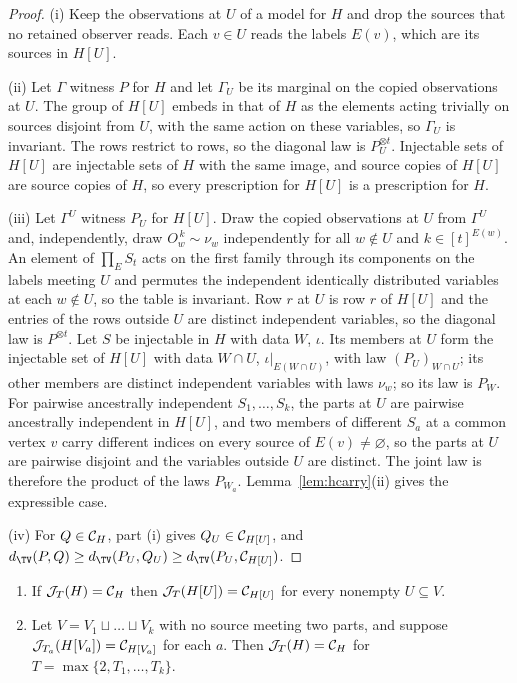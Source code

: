 \begin{proof}
(i) Keep the observations at $U$ of a model for $H$ and drop the sources that no retained observer reads. Each $v\in U$ reads the labels $E(v)$, which are its sources in $H[U]$.

(ii) Let $\Gamma$ witness $P$ for $H$ and let $\Gamma_U$ be its marginal on the copied observations at $U$. The group of $H[U]$ embeds in that of $H$ as the elements acting trivially on sources disjoint from $U$, with the same action on these variables, so $\Gamma_U$ is invariant. The rows restrict to rows, so the diagonal law is $P_U^{\otimes t}$. Injectable sets of $H[U]$ are injectable sets of $H$ with the same image, and source copies of $H[U]$ are source copies of $H$, so every prescription for $H[U]$ is a prescription for $H$.

(iii) Let $\Gamma^U$ witness $P_U$ for $H[U]$. Draw the copied observations at $U$ from $\Gamma^U$ and, independently, draw $O_w^{\,k}\sim\nu_w$ independently for all $w\notin U$ and $k\in[t]^{E(w)}$. An element of $\prod_ES_t$ acts on the first family through its components on the labels meeting $U$ and permutes the independent identically distributed variables at each $w\notin U$, so the table is invariant. Row $r$ at $U$ is row $r$ of $H[U]$ and the entries of the rows outside $U$ are distinct independent variables, so the diagonal law is $P^{\otimes t}$. Let $S$ be injectable in $H$ with data $W$, $\iota$. Its members at $U$ form the injectable set of $H[U]$ with data $W\cap U$, $\iota|_{E(W\cap U)}$, with law $(P_U)_{W\cap U}$; its other members are distinct independent variables with laws $\nu_w$; so its law is $P_W$. For pairwise ancestrally independent $S_1,\dots,S_k$, the parts at $U$ are pairwise ancestrally independent in $H[U]$, and two members of different $S_a$ at a common vertex $v$ carry different indices on every source of $E(v)\ne\varnothing$, so the parts at $U$ are pairwise disjoint and the variables outside $U$ are distinct. The joint law is therefore the product of the laws $P_{W_a}$. Lemma~\ref{lem:hcarry}(ii) gives the expressible case.

(iv) For $Q\in\mathcal C_{H}$, part (i) gives $Q_U\in\mathcal C_{H[U]}$, and $d_{\TV}(P,Q)\ge d_{\TV}(P_U,Q_U)\ge d_{\TV}(P_U,\Cscen{H[U]})$.
\end{proof}

\begin{corollary}\label{cor:hblocks}
\begin{enumerate}[label=(\roman*),nosep]
\item If $\mathcal J_T(H)=\mathcal C_{H}$ then $\mathcal J_T(H[U])=\mathcal C_{H[U]}$ for every nonempty $U\subseteq V$.
\item Let $V=V_1\sqcup\dots\sqcup V_k$ with no source meeting two parts, and suppose $\mathcal J_{T_a}(H[V_a])=\mathcal C_{H[V_a]}$ for each $a$. Then $\mathcal J_T(H)=\mathcal C_{H}$ for $T=\max\{2,T_1,\dots,T_k\}$.
\end{enumerate}
\end{corollary}

